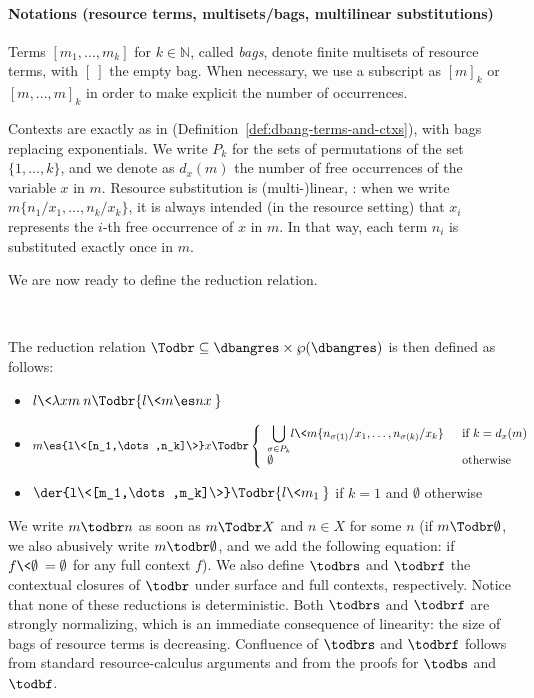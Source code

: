 \paragraph*{Notations (resource terms, multisets/bags, multilinear substitutions)}
Terms $[m_1,\dots ,m_k]$ for $k\in\mathbb N$, called \emph{bags}, denote finite
multisets of resource terms, with $[~]$ the empty bag. When necessary, we use a subscript as $[m]_k$ or
$[m,\dots ,m]_k$ in order to make explicit the number of occurrences.

Contexts are exactly
as in \dbang{}
(Definition~\ref{def:dbang-terms-and-ctxs}), with bags replacing exponentials.
We write $P_k$ for the sets of
permutations of the set $\{1,\dots ,k\}$, and we denote as $d_x(m)$ the number of
free occurrences of the variable $x$ in $m$. Resource substitution is
(multi-)linear, : when we write
$m\{n_1/x_1,\dots ,n_k/x_k\}$, it is always intended (in the resource setting) 
that $x_i$ represents the $i$-th free occurrence of $x$ in $m$. In that way,
each term $n_i$ is substituted exactly once in $m$.

We are now ready to define the reduction relation.
\begin{definition}~
	\label{def:dbang-taylor-reductions}
	
	The reduction relation $\Todbr\subseteq\dbangres\times\mathbb
	\wp(\dbangres)$ is
	then defined as follows:
	\begin{itemize}
		\item $l\<\lambda x m\>n \Todbr \{l\<m\es nx\>\}$
		\item $m\es{l\<[n_1,\dots ,n_k]\>}x \Todbr 
		\left\{\begin{array}{ll}
			\displaystyle{\bigcup_{\sigma\in
			P_k}}l\<m\{n_{\sigma(1)}/x_1,\dots ,n_{\sigma(k)}/x_k\}\> & \text{ if }
			k=d_x(m) \\
			\emptyset & \text{ otherwise}
		\end{array}\right.$
		\item $\der{l\<[m_1,\dots ,m_k]\>} \Todbr \{l\<m_1\>\}$ if $k=1$ and
			$\emptyset$ otherwise
	\end{itemize}
\end{definition}

%
We write $m\todbr n$ as soon as $m\Todbr X$ and $n\in X$ for some $n$ (if
$m\Todbr \emptyset$, we also abusively write $m\todbr \emptyset$, and we add the
following equation: if $f\<\emptyset\>=\emptyset$ for any full context $f$). We
also define $\todbrs$ and $\todbrf$ the contextual closures of $\todbr$ under
surface and full contexts, respectively. Notice that none of these reductions is
deterministic.
%
Both $\todbrs$ and $\todbrf$ are strongly normalizing, which is an immediate
consequence of linearity: the size of bags of resource terms is decreasing. Confluence of $\todbrs$ and $\todbrf$ follows from standard resource-calculus arguments and from the proofs for
$\todbs$ and $\todbf$. 

